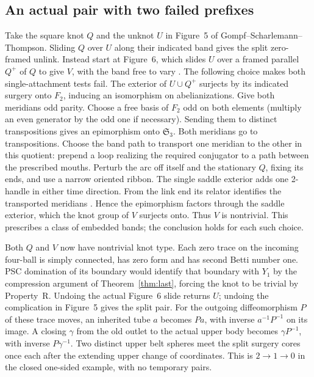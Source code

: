 \documentclass[11pt,letterpaper]{article}
\numberwithin{equation}{section}
\theoremstyle{remark}
\begin{document}
\subsection{An actual pair with two failed prefixes}
Take the square knot \(Q\) and the unknot \(U\) in Figure~5 of
Gompf--Scharlemann--Thompson. Sliding \(Q\) over \(U\) along their
indicated band gives the split zero-framed unlink. Instead start
at Figure~6, which slides \(U\) over a framed parallel \(Q^+\) of
\(Q\) to give \(V\), with the band free to vary
\cite[Figures 5--6 and \S6]{GompfScharlemannThompson2010}.
The following choice makes both single-attachment tests fail.
The exterior of \(U\cup Q^+\) surjects by its indicated surgery onto
\(F_2\), inducing an isomorphism on abelianizations. Give both
meridians odd parity. Choose a free basis of \(F_2\) odd on
both elements (multiply an even generator by the odd one if
necessary). Sending them to distinct transpositions gives an
epimorphism onto \(\mathfrak S_3\). Both meridians go to transpositions.
Choose the band path to transport one meridian to the other in this
quotient: prepend a loop realizing the required conjugator to a path
between the prescribed mouths. Perturb the arc off itself and the
stationary \(Q\), fixing its ends, and use a narrow oriented ribbon.
The single saddle exterior adds one 2-handle in either time direction.
From the link end its relator identifies the transported meridians
\cite[\S3.1]{Sunukjian2015Surfaces}. Hence the epimorphism factors
through the saddle exterior, which the knot group of \(V\) surjects
onto. Thus \(V\) is nontrivial. This prescribes a class of embedded
bands; the conclusion holds for each such choice.

Both \(Q\) and \(V\) now have nontrivial knot type. Each zero
trace on the incoming four-ball is simply connected, has zero form
and has second Betti number one. PSC domination of its boundary
would identify that boundary with \(Y_1\) by the compression argument
of Theorem~\ref{thm:last}, forcing the knot to be trivial by Property~R.
Undoing the actual Figure~6 slide returns \(U\); undoing the
complication in Figure~5 gives the split pair. For the outgoing
diffeomorphism \(P\) of these trace moves, an inherited tube \(a\)
becomes \(Pa\), with inverse \(a^{-1}P^{-1}\) on its image. A closing
\(\gamma\) from the old outlet to the actual upper body becomes
\(\gamma P^{-1}\), with inverse \(P\gamma^{-1}\). Two distinct
upper belt spheres meet the split surgery cores once each after
the extending upper change of coordinates. This is \(2\to1\to0\)
in the closed one-sided example, with no temporary pairs.
\end{document}
